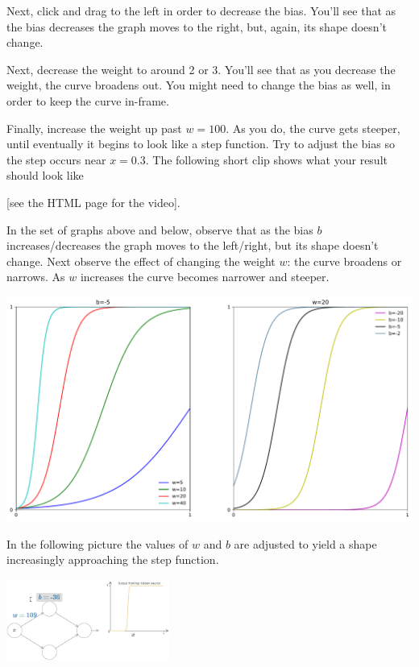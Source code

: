 Next, click and drag to the left in order to decrease the bias. You'll see that as the bias decreases the graph moves to the right, but, again, its shape doesn't change.

Next, decrease the weight to around 2 or 3. You'll see that as you decrease the weight, the curve broadens out. You might need to change the bias as well, in order to keep the curve in-frame.

Finally, increase the weight up past $w=100$. As you do, the curve gets steeper, until eventually it begins to look like a step function. Try to adjust the bias so the step occurs near $x=0.3$. The following short clip shows what your result should look like 

[see the HTML page for the video].



In the set of graphs above and below, observe  that as the bias $b$ increases/decreases the graph moves to the left/right, but its shape doesn't change.
Next observe the effect of changing the weight $w$: the curve broadens or narrows. As $w$ increases the curve becomes narrower and steeper.

{\centering \includegraphics[width=\textwidth,]{pic/sigmoid1x2plot} \par}

In the following picture the values of $w$ and $b$ are adjusted to yield a shape increasingly approaching the step function.
{\centering \includegraphics[width=0.4\textwidth,]{pic/wigglyfn08.png} \par}


